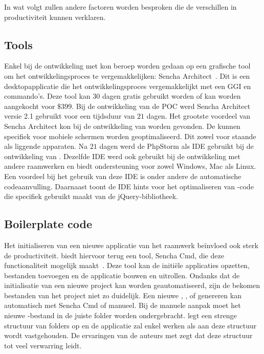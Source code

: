 In wat volgt zullen andere factoren worden besproken die de verschillen in productiviteit kunnen verklaren.

\subsection{Tools}
Enkel bij de ontwikkeling met \st{} kon beroep worden gedaan op een grafische tool om het ontwikkelingsproces te vergemakkelijken:  Sencha Architect~\cite{Sencha2012a}.
Dit is een desktopapplicatie die het ontwikkelingsproces vergemakkelijkt met een GGI en  commando's.  
Deze tool kan 30 dagen gratis gebruikt worden of kan worden aangekocht voor $\$399$.
Bij de ontwikkeling van de POC werd Sencha Architect versie 2.1 gebruikt voor een tijdsduur van $21$ dagen.
Het grootste voordeel van Sencha Architect kon bij de ontwikkeling van  worden gevonden.
De  kunnen specifiek voor mobiele schermen worden geoptimaliseerd.
Dit zowel voor staande als liggende apparaten.
Na $21$ dagen werd de PhpStorm als IDE gebruikt bij de ontwikkeling van \st{}.
Dezelfde IDE werd ook gebruikt bij de ontwikkeling met andere raamwerken en biedt ondersteuning voor zowel Windows, Mac als Linux.
Een voordeel bij het gebruik van deze IDE is onder andere de automatische codeaanvulling.
Daarnaast toont de IDE hints voor het optimaliseren van \js{}-code die specifiek gebruikt maakt van de jQuery-bibliotheek.




\subsection{Boilerplate code}
Het initialiseren van een nieuwe applicatie van het raamwerk beïnvloed ook sterk de productiviteit.
\st{} biedt hiervoor terug een tool,  Sencha Cmd,  die deze functionaliteit mogelijk maakt~\cite{Sencha2012}.
Deze tool kan de initiële applicaties opzetten,  bestanden toevoegen en de applicatie bouwen en uitrollen.
Ondanks dat de initialisatie van een nieuwe project kan worden geautomatiseerd, zijn de bekomen bestanden van het project niet zo duidelijk.
Een nieuwe ,  ,   of  genereren kan automatisch met Sencha Cmd of manueel.
Bij de manuele aanpak moet het nieuwe \js-bestand in de juiste folder worden ondergebracht.
\st{} legt een strenge structuur van folders op en de applicatie zal enkel werken als aan deze structuur wordt vastgehouden.
De ervaringen van de auteurs met \st{} zegt dat deze structuur tot veel verwarring leidt.

